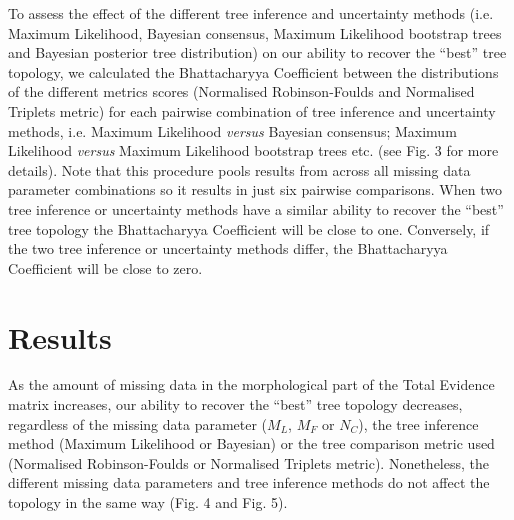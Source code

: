 \documentclass[12pt,letterpaper]{article}
\begin{document}
To assess the effect of the different tree inference and uncertainty methods (i.e. Maximum Likelihood, Bayesian consensus, Maximum Likelihood bootstrap trees and Bayesian posterior tree distribution) on our ability to recover the ``best'' tree topology, we calculated the Bhattacharyya Coefficient between the distributions of the different metrics scores (Normalised Robinson-Foulds and Normalised Triplets metric) for each pairwise combination of tree inference and uncertainty methods, i.e. Maximum Likelihood \textit{versus} Bayesian consensus; Maximum Likelihood \textit{versus} Maximum Likelihood bootstrap trees etc. (see Fig. 3 for more details).
Note that this procedure pools results from across all missing data parameter combinations so it results in just six pairwise comparisons.
When two tree inference or uncertainty methods have a similar ability to recover the ``best'' tree topology the Bhattacharyya Coefficient will be close to one.
Conversely, if the two tree inference or uncertainty methods differ, the Bhattacharyya Coefficient will be close to zero.


%
%

\section{Results}
As the amount of missing data in the morphological part of the Total Evidence matrix increases, our ability to recover the ``best'' tree topology decreases, regardless of the missing data parameter ($M_{L}$, $M_{F}$ or $N_{C}$), the tree inference method (Maximum Likelihood or Bayesian) or the tree comparison metric used (Normalised Robinson-Foulds or Normalised Triplets metric).
Nonetheless, the different missing data parameters and tree inference methods do not affect the topology in the same way (Fig. 4 and Fig. 5).
\end{document}
